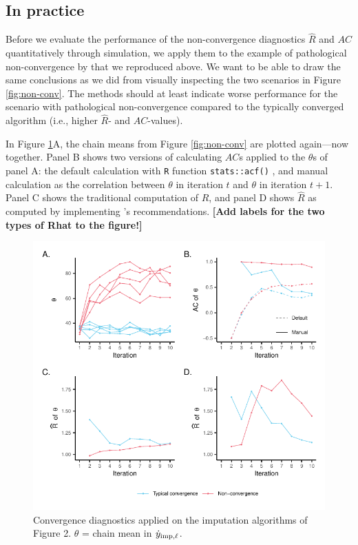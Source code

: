 \documentclass[Royal,times,sageh]{sagej}
\begin{document}
\hypertarget{in-practice}{%
\subsection{In practice}\label{in-practice}}

Before we evaluate the performance of the non-convergence diagnostics \(\widehat{R}\) and \(AC\) quantitatively through simulation, we apply them to the example of pathological non-convergence by \citet{buur18} that we reproduced above. We want to be able to draw the same conclusions as we did from visually inspecting the two scenarios in Figure \ref{fig:non-conv}. The methods should at least indicate worse performance for the scenario with pathological non-convergence compared to the typically converged algorithm (i.e., higher \(\widehat{R}\)- and \(AC\)-values).

In Figure \ref{fig:diagnostics}A, the chain means from Figure \ref{fig:non-conv} are plotted again---now together. Panel B shows two versions of calculating \(AC\)s applied to the \(\theta\)s of panel A: the default calculation with \texttt{R} function \texttt{stats::acf()} \citep{R}, and manual calculation as the correlation between \(\theta\) in iteration \(t\) and \(\theta\) in iteration \(t+1\). Panel C shows the traditional computation of \(\widehat{R}\), and panel D shows \(\widehat{R}\) as computed by implementing \citet{veht19} 's recommendations. \textbf{{[}Add labels for the two types of Rhat to the figure!{]}}

\begin{figure}

{\centering \includegraphics{2.Manuscript_files/figure-latex/diagnostics-1} 

}

\caption{Convergence diagnostics applied on the imputation algorithms of Figure 2. $\theta$ = chain mean in $ \dot y_{\rm imp, \ell} $.}\label{fig:diagnostics}
\end{figure}
\end{document}
